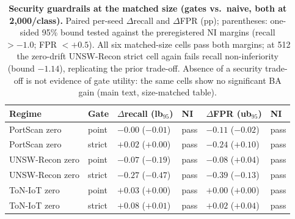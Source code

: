 \begin{table}
\centering
\caption{\textbf{Security guardrails at the matched size (gates vs.\ naive, both at
2{,}000/class).} Paired per-seed $\Delta$recall and $\Delta$FPR (pp); parentheses:
one-sided 95\% bound tested against the preregistered NI margins (recall $>-1.0$;
FPR $<+0.5$). All six matched-size cells pass both margins; at 512 the zero-drift
UNSW-Recon strict cell again fails recall non-inferiority
(bound $-1.14$), replicating the prior trade-off. Absence of a
security trade-off is not evidence of gate utility: the same cells show no significant BA
gain (main text, size-matched table).}
\label{tab:size_matched_security}
\footnotesize
\begin{tabular}{l l l l l l}
\toprule
Regime & Gate & $\Delta$recall (lb$_{95}$) & NI & $\Delta$FPR (ub$_{95}$) & NI \\
\midrule
PortScan zero & point & $-0.00$ ($-0.01$) & pass & $-0.11$ ($-0.02$) & pass \\
PortScan zero & strict & $+0.02$ ($+0.00$) & pass & $-0.24$ ($+0.10$) & pass \\
\addlinespace
UNSW-Recon zero & point & $-0.07$ ($-0.19$) & pass & $-0.08$ ($+0.04$) & pass \\
UNSW-Recon zero & strict & $-0.27$ ($-0.47$) & pass & $-0.39$ ($-0.13$) & pass \\
\addlinespace
ToN-IoT zero & point & $+0.03$ ($+0.00$) & pass & $+0.00$ ($+0.00$) & pass \\
ToN-IoT zero & strict & $+0.08$ ($+0.01$) & pass & $+0.02$ ($+0.04$) & pass \\
\bottomrule
\end{tabular}
\end{table}
